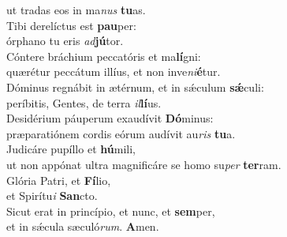 \oddverse ut tradas eos in ma\textit{nus} \textbf{tu}as.\\
\evenverse Tibi derelíctus est \textbf{pau}per:~\*\\
\evenverse órphano tu eris \textit{ad}\textbf{jú}tor.\\
\oddverse Cóntere bráchium peccatóris et ma\textbf{lí}gni:~\*\\
\oddverse quærétur peccátum illíus, et non inve\textit{ni}\textbf{é}tur.\\
\evenverse Dóminus regnábit in ætérnum, et in sǽculum \textbf{sǽ}culi:~\*\\
\evenverse períbitis, Gentes, de terra \textit{il}\textbf{lí}us.\\
\oddverse Desidérium páuperum exaudívit \textbf{Dó}minus:~\*\\
\oddverse præparatiónem cordis eórum audívit au\textit{ris} \textbf{tu}a.\\
\evenverse Judicáre pupíllo et \textbf{hú}mili,~\*\\
\evenverse ut non appónat ultra magnificáre se homo su\textit{per} \textbf{ter}ram.\\
\oddverse Glória Patri, et \textbf{Fí}lio,~\*\\
\oddverse et Spirítu\textit{i} \textbf{San}cto.\\
\evenverse Sicut erat in princípio, et nunc, et \textbf{sem}per,~\*\\
\evenverse et in sǽcula sæculó\textit{rum}. \textbf{A}men.\\
